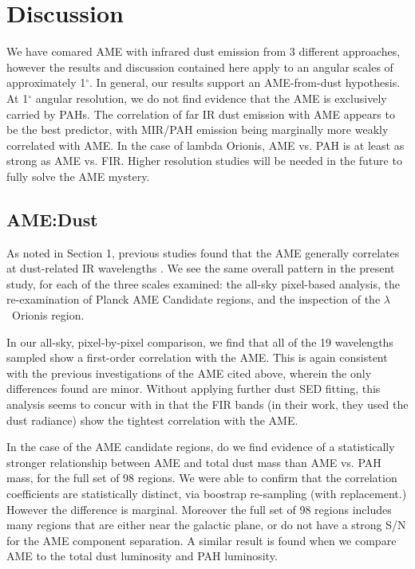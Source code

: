\documentclass[preprint2,longabstract]{aastex}
\begin{document}
\section{Discussion}
  \label{sec:discussion}

  We have comared AME with infrared dust emission from 3 different approaches, however the results and discussion contained here apply to an angular scales of approximately 1$^{\circ}$. In general, our results support an AME-from-dust hypothesis. At 1$^{\circ}$ angular resolution, we do not find evidence that the AME is exclusively carried by PAHs. The correlation of far IR dust emission with AME appears to be the best predictor, with MIR/PAH emission being marginally more weakly correlated with AME. In the case of lambda Orionis, AME vs. PAH is at least as strong as AME vs. FIR. Higher resolution studies will be needed in the future to fully solve the AME mystery.

      \subsection{AME:Dust}

        As noted in Section 1, previous studies found that the AME generally correlates at dust-related IR wavelengths \citep{ysard10b,planckXV, hensley16}. We see the same overall pattern in the present study, for each of the three scales examined: the all-sky pixel-based analysis, the re-examination of Planck AME Candidate regions, and the inspection of the $\lambda$~Orionis region.

         In our all-sky, pixel-by-pixel comparison, we find that all of the 19 wavelengths sampled show a first-order correlation with the AME. This is again consistent with the previous investigations of the AME cited above, wherein the only differences found are minor. Without applying further dust SED fitting, this analysis seems to concur with \cite{hensley16} in that the FIR bands (in their work, they used the dust radiance) show the tightest correlation with the AME.

        In the case of the AME candidate regions, do we find evidence of a statistically stronger relationship between AME and total dust mass than AME vs. PAH mass, for the full set of 98 regions. We were able to confirm that the correlation coefficients are statistically distinct, via boostrap re-sampling (with replacement.) However the difference is marginal. Moreover the full set of 98 regions includes many regions that are either near the galactic plane, or do not have a strong S/N for the AME component separation. A similar result is found when we compare AME to the total dust luminosity and PAH luminosity.
\end{document}
